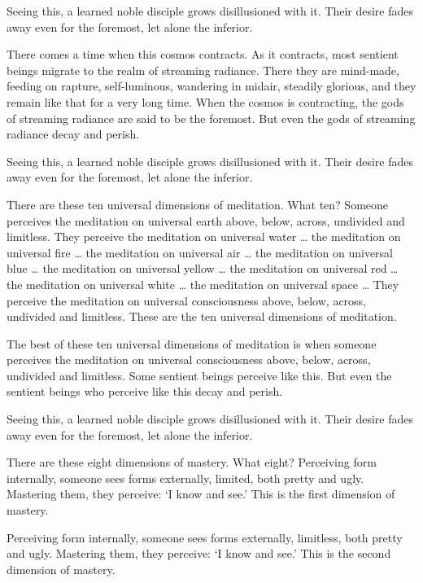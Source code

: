 \documentclass[12pt,openany]{book}%
\begin{document}
Seeing this, a learned noble disciple grows disillusioned with it. Their desire fades away even for the foremost, let alone the inferior. 

There comes a time when this cosmos contracts. As it contracts, most sentient beings migrate to the realm of streaming radiance. There they are mind-made, feeding on rapture, self-luminous, wandering in midair, steadily glorious, and they remain like that for a very long time. When the cosmos is contracting, the gods of streaming radiance are said to be the foremost. But even the gods of streaming radiance decay and perish. 

Seeing this, a learned noble disciple grows disillusioned with it. Their desire fades away even for the foremost, let alone the inferior. 

There are these ten universal dimensions of meditation. What ten? Someone perceives the meditation on universal earth above, below, across, undivided and limitless. They perceive the meditation on universal water … the meditation on universal fire … the meditation on universal air … the meditation on universal blue … the meditation on universal yellow … the meditation on universal red … the meditation on universal white … the meditation on universal space … They perceive the meditation on universal consciousness above, below, across, undivided and limitless. These are the ten universal dimensions of meditation. 

The best of these ten universal dimensions of meditation is when someone perceives the meditation on universal consciousness above, below, across, undivided and limitless. Some sentient beings perceive like this. But even the sentient beings who perceive like this decay and perish. 

Seeing this, a learned noble disciple grows disillusioned with it. Their desire fades away even for the foremost, let alone the inferior. 

There are these eight dimensions of mastery. What eight? Perceiving form internally, someone sees forms externally, limited, both pretty and ugly. Mastering them, they perceive: ‘I know and see.’ This is the first dimension of mastery. 

Perceiving form internally, someone sees forms externally, limitless, both pretty and ugly. Mastering them, they perceive: ‘I know and see.’ This is the second dimension of mastery. 
\end{document}

